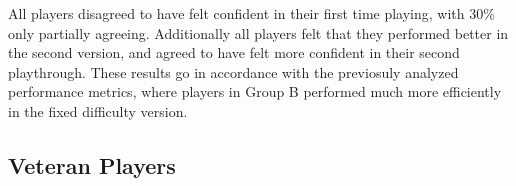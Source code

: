 All players disagreed to have felt confident in their first time playing, with 30\% only partially agreeing. Additionally all players felt that they performed better in the second version, and agreed to have felt more confident in their second playthrough. These results go in accordance with the previosuly analyzed performance metrics, where players in Group B performed much more efficiently in the fixed difficulty version.


\subsection{Veteran Players}



